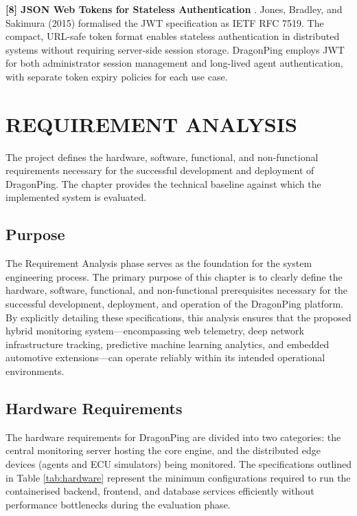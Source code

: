\documentclass[12pt,a4paper,oneside]{report}
\begin{document}
\noindent \textbf{[8] JSON Web Tokens for Stateless Authentication} \cite{jwt_rfc}. Jones, Bradley, and Sakimura (2015) formalised the JWT specification as IETF RFC 7519. The compact, URL-safe token format enables stateless authentication in distributed systems without requiring server-side session storage. DragonPing employs JWT for both administrator session management and long-lived agent authentication, with separate token expiry policies for each use case.
\chapter{REQUIREMENT ANALYSIS}

The project defines the hardware, software, functional, and non-functional requirements necessary for the successful development and deployment of DragonPing. The chapter provides the technical baseline against which the implemented system is evaluated.

\section{Purpose}
\noindent The Requirement Analysis phase serves as the foundation for the system engineering process. The primary purpose of this chapter is to clearly define the hardware, software, functional, and non-functional prerequisites necessary for the successful development, deployment, and operation of the DragonPing platform. By explicitly detailing these specifications, this analysis ensures that the proposed hybrid monitoring system---encompassing web telemetry, deep network infrastructure tracking, predictive machine learning analytics, and embedded automotive extensions---can operate reliably within its intended operational environments.

\section{Hardware Requirements}
\noindent The hardware requirements for DragonPing are divided into two categories: the central monitoring server hosting the core engine, and the distributed edge devices (agents and ECU simulators) being monitored. The specifications outlined in Table \ref{tab:hardware} represent the minimum configurations required to run the containerised backend, frontend, and database services efficiently without performance bottlenecks during the evaluation phase.
\end{document}

